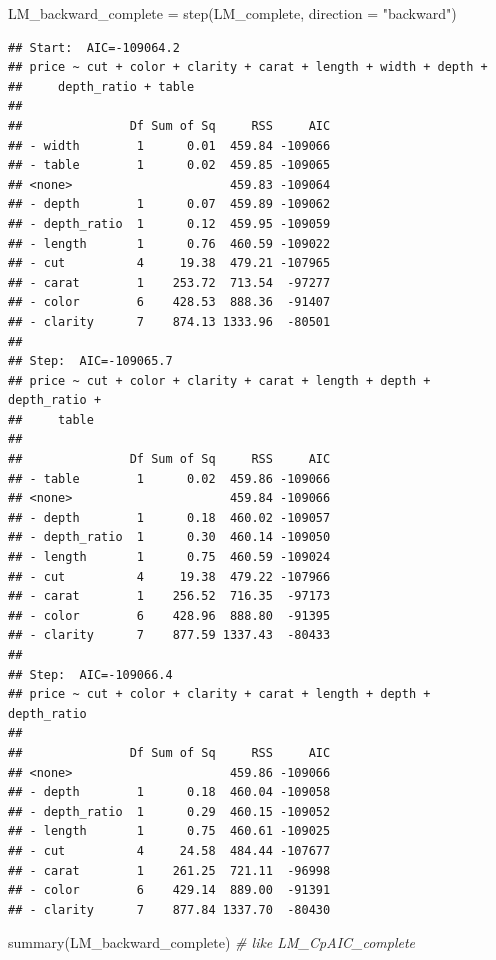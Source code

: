 \documentclass[
]{article}
\newenvironment{Shaded}{\begin{snugshade}}{\end{snugshade}}
\newcommand{\AttributeTok}[1]{\textcolor[rgb]{0.77,0.63,0.00}{#1}}
\newcommand{\CommentTok}[1]{\textcolor[rgb]{0.56,0.35,0.01}{\textit{#1}}}
\newcommand{\FunctionTok}[1]{\textcolor[rgb]{0.00,0.00,0.00}{#1}}
\newcommand{\NormalTok}[1]{#1}
\newcommand{\OtherTok}[1]{\textcolor[rgb]{0.56,0.35,0.01}{#1}}
\newcommand{\StringTok}[1]{\textcolor[rgb]{0.31,0.60,0.02}{#1}}
\begin{document}
\begin{Shaded}
\begin{Highlighting}[]
\NormalTok{LM\_backward\_complete }\OtherTok{=} \FunctionTok{step}\NormalTok{(LM\_complete, }\AttributeTok{direction =} \StringTok{"backward"}\NormalTok{)}
\end{Highlighting}
\end{Shaded}

\begin{verbatim}
## Start:  AIC=-109064.2
## price ~ cut + color + clarity + carat + length + width + depth +
##     depth_ratio + table
##
##               Df Sum of Sq     RSS     AIC
## - width        1      0.01  459.84 -109066
## - table        1      0.02  459.85 -109065
## <none>                      459.83 -109064
## - depth        1      0.07  459.89 -109062
## - depth_ratio  1      0.12  459.95 -109059
## - length       1      0.76  460.59 -109022
## - cut          4     19.38  479.21 -107965
## - carat        1    253.72  713.54  -97277
## - color        6    428.53  888.36  -91407
## - clarity      7    874.13 1333.96  -80501
##
## Step:  AIC=-109065.7
## price ~ cut + color + clarity + carat + length + depth + depth_ratio +
##     table
##
##               Df Sum of Sq     RSS     AIC
## - table        1      0.02  459.86 -109066
## <none>                      459.84 -109066
## - depth        1      0.18  460.02 -109057
## - depth_ratio  1      0.30  460.14 -109050
## - length       1      0.75  460.59 -109024
## - cut          4     19.38  479.22 -107966
## - carat        1    256.52  716.35  -97173
## - color        6    428.96  888.80  -91395
## - clarity      7    877.59 1337.43  -80433
##
## Step:  AIC=-109066.4
## price ~ cut + color + clarity + carat + length + depth + depth_ratio
##
##               Df Sum of Sq     RSS     AIC
## <none>                      459.86 -109066
## - depth        1      0.18  460.04 -109058
## - depth_ratio  1      0.29  460.15 -109052
## - length       1      0.75  460.61 -109025
## - cut          4     24.58  484.44 -107677
## - carat        1    261.25  721.11  -96998
## - color        6    429.14  889.00  -91391
## - clarity      7    877.84 1337.70  -80430
\end{verbatim}

\begin{Shaded}
\begin{Highlighting}[]
\FunctionTok{summary}\NormalTok{(LM\_backward\_complete)   }\CommentTok{\# like LM\_CpAIC\_complete}
\end{Highlighting}
\end{Shaded}
\end{document}
